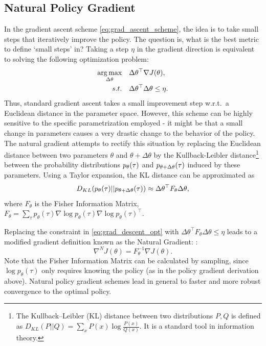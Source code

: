 \subsection{Natural Policy Gradient}
In the gradient ascent scheme \eqref{eq:grad_ascent_scheme}, the idea is to take small steps that iteratively improve the policy. The question is, what is the best metric to define `small steps' in?
Taking a step $\eta$ in the gradient direction is equivalent to solving the following optimization problem:
\begin{equation}\label{eq:grad_descent_opt}
    \begin{split}
        \argmax_{\Delta \theta}&\quad \Delta \theta^\top \nabla J(\theta), \\
        s.t. &\quad \Delta \theta^\top \Delta \theta \leq \eta.
    \end{split}
\end{equation}
Thus, standard gradient ascent takes a small improvement step w.r.t.~a Euclidean distance in the parameter space. However, this scheme can be highly sensitive to the specific parametrization employed - it might be that a small change in parameters causes a very drastic change to the behavior of the policy. The natural gradient attempts to rectify this situation by replacing the Euclidean distance between two parameters $\theta $  and $\theta+\Delta\theta$ by the Kullback-Leibler distance\footnote{The Kullback–Leibler (KL) distance between two distributions $P,Q$ is defined as $D_{KL}(P||Q) = \sum_{x}P(x)\log \frac{P(x)}{Q(x)}$. It is a standard tool in information theory.} between the probability distributions ${p_\theta }({\bf{\tau }})$ and ${p_{\theta+\Delta\theta}}({\bf{\tau }})$ induced by these parameters. Using a Taylor expansion, the KL distance can be approximated as 
\begin{equation*}
    D_{KL}({p_\theta }({\bf{\tau }})||{p_{\theta+\Delta\theta}}({\bf{\tau }})) \approx \Delta \theta^\top F_\theta \Delta \theta,
\end{equation*}
where $F_\theta$ is the Fisher Information Matrix, $F_\theta = \sum_\tau p_\theta(\tau) \nabla \log p_\theta(\tau) \nabla \log p_\theta(\tau)^\top.$

Replacing the constraint in \eqref{eq:grad_descent_opt} with $\Delta \theta^\top F_\theta \Delta \theta \leq \eta$ leads to a modified gradient definition known as the Natural Gradient: :
\[{\nabla ^N}J(\theta ) = F_{\theta}^{ - 1}\nabla J(\theta ).\]
Note that the Fisher Information Matrix can be calculated by sampling, since $\log p_\theta(\tau)$ only requires knowing the policy (as in the policy gradient derivation above). 
Natural policy gradient schemes lead in general to faster and more robust convergence to the optimal policy.


